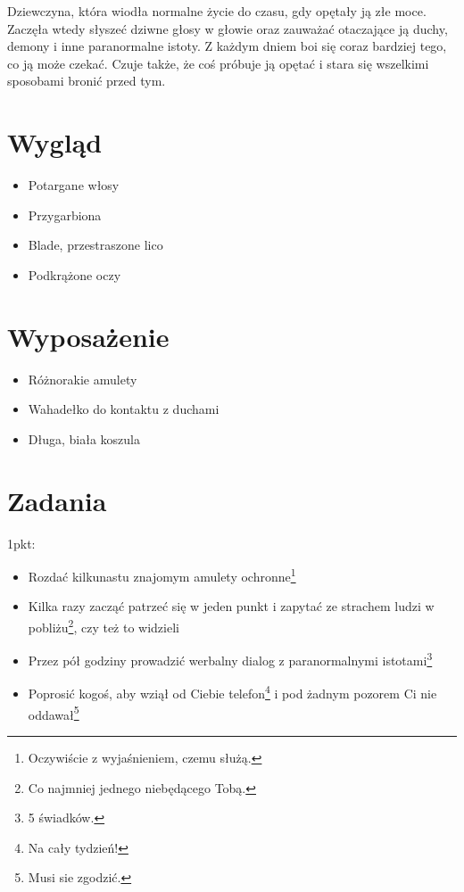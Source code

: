 \documentclass[11pt,a4paper,sans]{moderncv}        %
\title{}                               %
\begin{document}
\makecvtitle
Dziewczyna, która wiodła normalne życie do czasu, gdy opętały ją złe moce. Zaczęła wtedy słyszeć dziwne głosy
w głowie oraz zauważać otaczające ją duchy, demony i inne paranormalne istoty. Z każdym dniem boi się coraz bardziej
tego, co ją może czekać. Czuje także, że coś próbuje ją opętać i stara się wszelkimi sposobami bronić przed tym.

\section{Wygląd}
\begin{itemize}
	\item Potargane włosy
	\item Przygarbiona
	\item Blade, przestraszone lico
	\item Podkrążone oczy
\end{itemize}

\section{Wyposażenie}
\begin{itemize}
	\item Różnorakie amulety
	\item Wahadełko do kontaktu z duchami
	\item Długa, biała koszula
\end{itemize}


\section{Zadania}
1pkt:
\begin{itemize}
	\item Rozdać kilkunastu znajomym amulety ochronne\footnote{Oczywiście z wyjaśnieniem, czemu służą.}
	\item Kilka razy zacząć patrzeć się w jeden punkt i zapytać ze strachem ludzi w pobliżu\footnote{Co najmniej
		jednego niebędącego Tobą.}, czy też to widzieli
	\item Przez pół godziny prowadzić werbalny dialog z paranormalnymi istotami\footnote{5 świadków.}
	\item Poprosić kogoś, aby wziął od Ciebie telefon\footnote{Na cały tydzień!} i pod żadnym pozorem Ci nie
		oddawał\footnote{Musi sie zgodzić.}
\end{itemize}
\newpage
\end{document}
